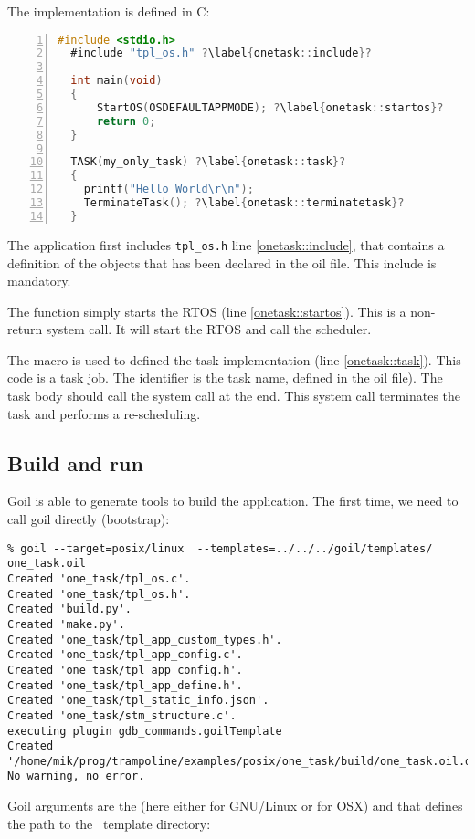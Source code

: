 The implementation is defined in C:

\begin{lstlisting}[language=C,numbers=left,escapechar=?]
  #include <stdio.h>
  #include "tpl_os.h" ?\label{onetask::include}?
  
  int main(void)
  {
      StartOS(OSDEFAULTAPPMODE); ?\label{onetask::startos}?
      return 0;
  }
  
  TASK(my_only_task) ?\label{onetask::task}?
  {   
    printf("Hello World\r\n");
    TerminateTask(); ?\label{onetask::terminatetask}?
  }  
  \end{lstlisting}

The application first includes \texttt{tpl_os.h} line \ref{onetask::include}, that contains a definition of the objects that has been declared in the oil file. This include is mandatory.

The  function simply starts the RTOS (line \ref{onetask::startos}). This is a non-return system call. It will start the RTOS and call the scheduler.

The macro  is used to defined the task implementation (line {\ref{onetask::task}}). This code is a task job. The identifier is the task name, defined in the oil file). The task body should call the system call  at the end. This system call terminates the task and performs a re-scheduling.


\subsection{Build and run}

Goil is able to generate tools to build the application. The first time, we need to call goil directly (bootstrap):
\begin{verbatim}
% goil --target=posix/linux  --templates=../../../goil/templates/ one_task.oil  
Created 'one_task/tpl_os.c'.
Created 'one_task/tpl_os.h'.
Created 'build.py'.
Created 'make.py'.
Created 'one_task/tpl_app_custom_types.h'.
Created 'one_task/tpl_app_config.c'.
Created 'one_task/tpl_app_config.h'.
Created 'one_task/tpl_app_define.h'.
Created 'one_task/tpl_static_info.json'.
Created 'one_task/stm_structure.c'.
executing plugin gdb_commands.goilTemplate
Created '/home/mik/prog/trampoline/examples/posix/one_task/build/one_task.oil.dep'.
No warning, no error.
\end{verbatim}
Goil arguments are the  (here either  for GNU/Linux or   for OSX) and  that defines the path to the \goil\ template directory:


